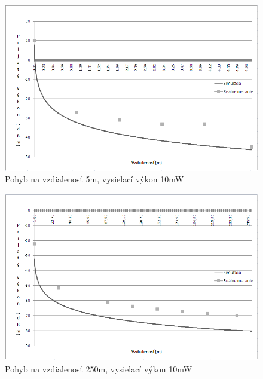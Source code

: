 \documentclass[11pt,twoside,a4paper]{book}
\begin{document}
\begin{figure}[htbp]
 \centering
 \includegraphics[width=13cm]{./figures/results/5m-10mw.png}
 \caption{Pohyb na vzdialenosť 5m, vysielací výkon 10mW}
 \label{fig:5m-10mW}
\end{figure}

\begin{figure}[htbp]
 \centering
 \includegraphics[width=13cm]{./figures/results/250-10mw.png}
 \caption{Pohyb na vzdialenosť 250m, vysielací výkon 10mW}
 \label{fig:250m-10mW}
\end{figure}
\end{document}
